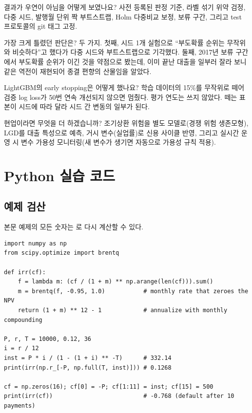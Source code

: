 \begin{qa}{결과가 우연이 아님을 어떻게 보였나요?}
사전 등록된 판정 기준, 라벨 섞기 위약 검정, 다중 시드, 발행월 단위 짝 부트스트랩, Holm 다중비교 보정, 보류 구간, 그리고 test 프로토콜의 git 태그 고정.
\end{qa}

\begin{qa}{가장 크게 틀렸던 판단은?}
두 가지. 첫째, 시드 1개 실험으로 ``부도확률 순위는 무작위와 비슷하다''고 했다가 다중 시드와 부트스트랩으로 기각했다. 둘째, 2017년 보류 구간에서 부도확률 순위가 이긴 것을 약점으로 봤는데, 이미 끝난 대출을 일부러 잘라 보니 같은 역전이 재현되어 종결 편향의 산물임을 알았다.
\end{qa}

\begin{qa}{LightGBM의 early stopping은 어떻게 했나요?}
학습 데이터의 15\%를 무작위로 떼어 검증 log loss가 50번 연속 개선되지 않으면 멈췄다. 평가 연도는 쓰지 않았다. 떼는 표본이 시드에 따라 달라 시드 간 변동의 일부가 된다.
\end{qa}

\begin{qa}{현업이라면 무엇을 더 하겠습니까?}
조기상환 위험을 별도 모델로(경쟁 위험 생존모형), LGD를 대출 특성으로 예측, 거시 변수(실업률)로 신용 사이클 반영, 그리고 실시간 운영 시 변수 가용성 모니터링(새 변수가 생기면 자동으로 가용성 규칙 적용).
\end{qa}

\chapter{Python 실습 코드}
\section{예제 검산}
본문 예제의 모든 숫자는 로 다시 계산할 수 있다.
\begin{lstlisting}
import numpy as np
from scipy.optimize import brentq

def irr(cf):
    f = lambda m: (cf / (1 + m) ** np.arange(len(cf))).sum()
    m = brentq(f, -0.95, 1.0)           # monthly rate that zeroes the NPV
    return (1 + m) ** 12 - 1            # annualize with monthly compounding

P, r, T = 10000, 0.12, 36
i = r / 12
inst = P * i / (1 - (1 + i) ** -T)      # 332.14
print(irr(np.r_[-P, np.full(T, inst)])) # 0.1268

cf = np.zeros(16); cf[0] = -P; cf[1:11] = inst; cf[15] = 500
print(irr(cf))                          # -0.768 (default after 10 payments)
\end{lstlisting}

